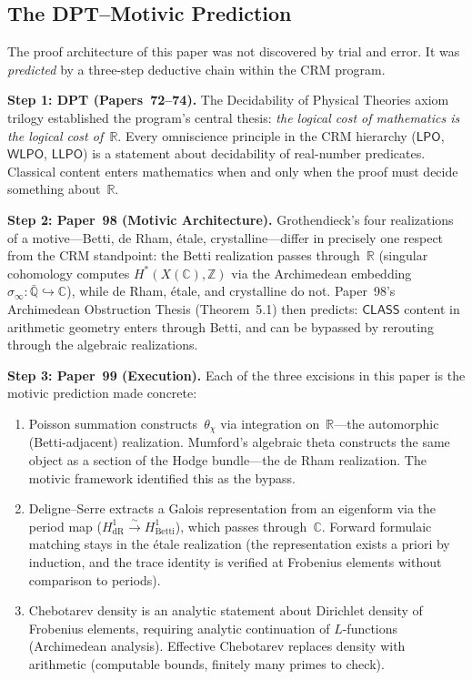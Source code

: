 \documentclass[11pt,a4paper]{article}
\theoremstyle{plain}
\theoremstyle{definition}
\newcommand{\WLPO}{\textsf{WLPO}}
\newcommand{\LLPO}{\textsf{LLPO}}
\newcommand{\LPO}{\textsf{LPO}}
\newcommand{\CLASS}{\textsf{CLASS}}
\newcommand{\Z}{\mathbb{Z}}
\newcommand{\Q}{\mathbb{Q}}
\newcommand{\R}{\mathbb{R}}
\newcommand{\C}{\mathbb{C}}
\begin{document}
\subsection{The DPT--Motivic Prediction}

The proof architecture of this paper was not discovered by trial and error.
It was \emph{predicted} by a three-step deductive chain within the CRM program.

\textbf{Step 1: DPT (Papers~72--74).}
The Decidability of Physical Theories axiom trilogy established the program's central thesis: \emph{the logical cost of mathematics is the logical cost of~$\R$}.
Every omniscience principle in the CRM hierarchy ($\LPO$, $\WLPO$, $\LLPO$) is a statement about decidability of real-number predicates.
Classical content enters mathematics when and only when the proof must decide something about~$\R$.

\textbf{Step 2: Paper~98 (Motivic Architecture).}
Grothendieck's four realizations of a motive---Betti, de Rham, \'etale, crystalline---differ in precisely one respect from the CRM standpoint: the Betti realization passes through~$\R$ (singular cohomology computes $H^*(X(\C), \Z)$ via the Archimedean embedding $\sigma_\infty : \bar{\Q} \hookrightarrow \C$), while de Rham, \'etale, and crystalline do not.
Paper~98's Archimedean Obstruction Thesis (Theorem~5.1) then predicts: $\CLASS$ content in arithmetic geometry enters through Betti, and can be bypassed by rerouting through the algebraic realizations.

\textbf{Step 3: Paper~99 (Execution).}
Each of the three excisions in this paper is the motivic prediction made concrete:
\begin{enumerate}[label=(\roman*)]
\item Poisson summation constructs~$\theta_\chi$ via integration on~$\R$---the automorphic (Betti-adjacent) realization.
Mumford's algebraic theta constructs the same object as a section of the Hodge bundle---the de Rham realization.
The motivic framework identified this as the bypass.
\item Deligne--Serre extracts a Galois representation from an eigenform via the period map ($H^1_{\text{dR}} \xrightarrow{\sim} H^1_{\text{Betti}}$), which passes through~$\C$.
Forward formulaic matching stays in the \'etale realization (the representation exists a priori by induction, and the trace identity is verified at Frobenius elements without comparison to periods).
\item Chebotarev density is an analytic statement about Dirichlet density of Frobenius elements, requiring analytic continuation of $L$-functions (Archimedean analysis).
Effective Chebotarev replaces density with arithmetic (computable bounds, finitely many primes to check).
\end{enumerate}
\end{document}

